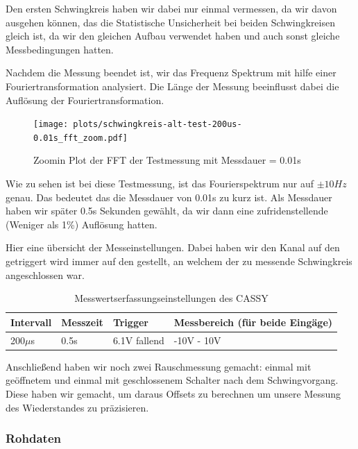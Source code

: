 \documentclass[twoside]{protokoll}
\begin{document}
Den ersten Schwingkreis haben wir dabei nur einmal vermessen, da wir davon ausgehen können, das die Statistische Unsicherheit bei beiden Schwingkreisen gleich ist, da wir den gleichen Aufbau verwendet haben und auch sonst gleiche Messbedingungen hatten.



Nachdem die Messung beendet ist, wir das Frequenz Spektrum mit hilfe einer Fouriertransformation analysiert.
Die Länge der Messung beeinflusst dabei die Auflösung der Fouriertransformation.
 
\begin{figure}[H]
    \centering
    \texttt{[image: plots/schwingkreis-alt-test-200us-0.01s\_fft\_zoom.pdf]}
    \caption{Zoomin Plot der FFT der Testmessung mit Messdauer = 0.01s}
\end{figure}
Wie zu sehen ist bei diese Testmessung, ist das Fourierspektrum nur auf $ \pm 10Hz $ genau. Das bedeutet das die Messdauer von 0.01s zu kurz ist.
Als Messdauer haben wir später 0.5s Sekunden gewählt, da wir dann eine zufridenstellende (Weniger als 1\%) Auflösung hatten.

Hier eine übersicht der Messeinstellungen. Dabei haben wir den Kanal auf den getriggert wird immer auf den gestellt, an welchem der zu messende Schwingkreis angeschlossen war.
\begin{table}[H]
        \centering
        \begin{tabularx}{1\textwidth}{X X X X} %
            \toprule
            \textbf{Intervall} & \textbf{Messzeit} & \textbf{Trigger} & \textbf{Messbereich (für beide Eingäge)} \\
            \midrule
            200$\mu$s  & 0.5s & 6.1V fallend & -10V - 10V \\
            \bottomrule
        \end{tabularx}
        \caption{Messwertserfassungseinstellungen des CASSY}
        \label{tab:mytable}
    \end{table}
     
Anschließend haben wir noch zwei Rauschmessung gemacht: einmal mit geöffnetem und einmal mit geschlossenem Schalter nach dem Schwingvorgang.
Diese haben wir gemacht, um daraus Offsets zu berechnen um unsere Messung des Wiederstandes zu präzisieren.


\subsubsection{Rohdaten}
\end{document}
